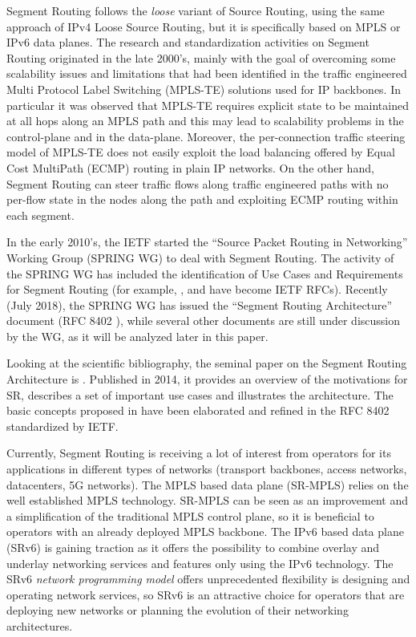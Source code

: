 Segment Routing follows the \textit{loose} variant of Source Routing, using the same approach of IPv4 Loose Source Routing, but it is specifically based on MPLS or IPv6 data planes. The research and standardization activities on Segment Routing originated in the late 2000's, mainly with the goal of overcoming some scalability issues and limitations \cite{rfc5439} that had been identified in the traffic engineered Multi Protocol Label Switching (MPLS-TE) solutions used for IP backbones. In particular it was observed that MPLS-TE requires explicit state to be maintained at all hops along an MPLS path and this may lead to scalability problems in the control-plane and in the data-plane. Moreover, the per-connection traffic steering model of MPLS-TE does not easily exploit the load balancing offered by Equal Cost MultiPath (ECMP) routing in plain IP networks. On the other hand, Segment Routing can steer traffic flows along traffic engineered paths with no per-flow state in the nodes along the path and exploiting ECMP routing within each segment. 

In the early 2010's, the IETF started the ``Source Packet Routing in Networking'' Working Group (SPRING WG) to deal with Segment Routing. The activity of the SPRING WG has included the identification of Use Cases and Requirements for Segment Routing (for example, \cite{rfc7855}, \cite{rfc8355} and \cite{rfc8354} have become IETF RFCs). Recently (July 2018), the SPRING WG has issued the ``Segment Routing Architecture'' document (RFC 8402 \cite{rfc8402}), while several other documents are still under discussion by the WG, as it will be analyzed later in this paper.

Looking at the scientific bibliography, the seminal paper on the Segment Routing Architecture is \cite{filsfils2015segment}. Published in 2014, it provides an overview of the motivations for SR, describes a set of important use cases and illustrates the architecture. The basic concepts proposed in \cite{filsfils2015segment} have been elaborated and refined in the RFC 8402 \cite{rfc8402} standardized by IETF. 

Currently, Segment Routing is receiving a lot of interest from operators for its applications in different types of networks (transport backbones, access networks, datacenters, 5G networks). The MPLS based data plane (SR-MPLS) relies on the well established MPLS technology. SR-MPLS can be seen as an improvement and a simplification of the traditional MPLS control plane, so it is beneficial to operators with an already deployed MPLS backbone. The IPv6 based data plane (SRv6) is gaining traction as it offers the possibility to combine overlay and underlay networking services and features only using the IPv6 technology. The SRv6 \textit{network programming model} offers unprecedented flexibility is designing and operating network services, so SRv6 is an attractive choice for operators that are deploying new networks or planning the evolution of their networking architectures.

